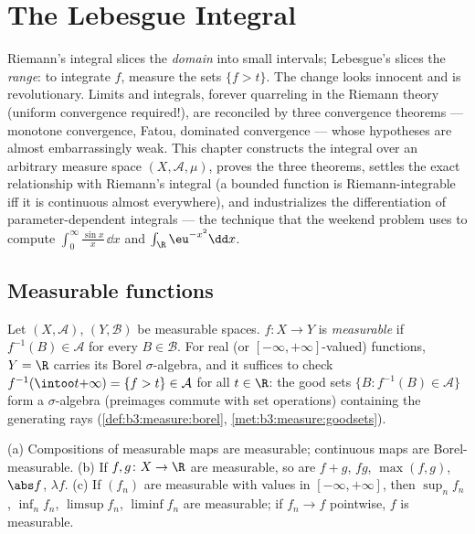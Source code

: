 \chapter{The Lebesgue Integral}\label{ch:b3:lebesgue}

Riemann's integral slices the \emph{domain} into small
intervals; Lebesgue's slices the \emph{range}: to integrate
$f$, measure the sets $\{f > t\}$. The change looks innocent
and is revolutionary. Limits and integrals, forever quarreling
in the Riemann theory (uniform convergence required!), are
reconciled by three convergence theorems --- monotone
convergence, Fatou, dominated convergence --- whose hypotheses
are almost embarrassingly weak. This chapter constructs the
integral over an arbitrary measure space $(X, \mathcal A,
\mu)$, proves the three theorems, settles the exact
relationship with Riemann's integral (a bounded function is
Riemann-integrable iff it is continuous almost everywhere), and
industrializes the differentiation of parameter-dependent
integrals --- the technique that the weekend problem uses to
compute $\int_0^\infty\frac{\sin x}x\,\dd x$ and
$\int_\R \eu^{-x^2}\dd x$.

\section{Measurable functions}

\begin{definition}\label{def:b3:lebesgue:measurable}
Let $(X, \mathcal A)$, $(Y, \mathcal B)$ be measurable spaces.
$f \colon X \to Y$ is \emph{measurable} if $f^{-1}(B) \in \mathcal A$ for every $B \in
\mathcal B$. For real (or $[-\infty,+\infty]$-valued)
functions, $Y = \R$ carries its Borel $\sigma$-algebra, and it
suffices to check $f^{-1}(\intoo t{+\infty}) = \{f > t\} \in
\mathcal A$ for all $t \in \R$: the good sets $\{B :
f^{-1}(B) \in \mathcal A\}$ form a $\sigma$-algebra
(preimages commute with set operations) containing the
generating rays (\cref{def:b3:measure:borel},
\cref{met:b3:measure:goodsets}).
\end{definition}

\begin{proposition}\label{prop:b3:lebesgue:stability}
(a) Compositions of measurable maps are measurable; continuous
maps are Borel-measurable.
(b) If $f, g \colon X \to \R$ are measurable, so are $f + g$,
$fg$, $\max(f,g)$, $\abs f$, $\lambda f$.
(c) If $(f_n)$ are measurable with values in
$[-\infty, +\infty]$, then $\sup_nf_n$, $\inf_nf_n$,
$\limsup f_n$, $\liminf f_n$ are measurable; if $f_n \to f$
pointwise, $f$ is measurable.
\end{proposition}

